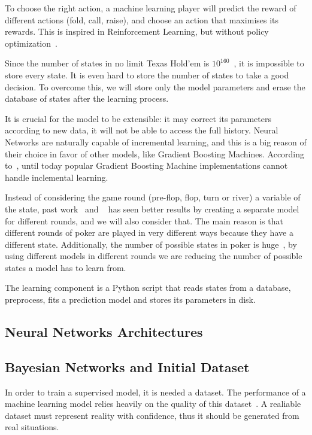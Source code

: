 To choose the right action, a machine learning player will predict the reward of different actions (fold, call, raise), and choose an action that maximises its rewards. This is inspired in Reinforcement Learning, but without policy optimization~\cite{Silver2016}.

Since the number of states in no limit Texas Hold’em is $10^{160}$~\cite{Johanson2013}, it is impossible to store every state. It is even hard to store the number of states to take a good decision. To overcome this, we will store only the model parameters and erase the database of states after the learning process.

It is crucial for the model to be extensible: it may correct its parameters according to new data, it will not be able to access the full history. Neural Networks are naturally capable of incremental learning, and this is a big reason of their choice in favor of other models, like Gradient Boosting Machines. According to~\cite{xgboost-github}, until today popular Gradient Boosting Machine implementations cannot handle inclemental learning.

Instead of considering the game round (pre-flop, flop, turn or river) a variable of the state, past work~\cite{Sirin2008} and ~\cite{Moravcik2017} has seen better results by creating a separate model for different rounds, and we will also consider that. The main reason is that different rounds of poker are played in very different ways because they have a different state. Additionally, the number of possible states in poker is huge~\cite{Johanson2013}, by using different models in different rounds we are reducing the number of possible states a model has to learn from.

The learning component is a Python script that reads states from a database, preprocess, fits a prediction model and stores its parameters in disk.

\subsection{Neural Networks Architectures}

\subsection{Bayesian Networks and Initial Dataset}
\label{sec:data-generation}

In order to train a supervised model, it is needed a dataset. The performance of a machine learning model relies heavily on the quality of this dataset~\cite{Polikar2001}. A realiable dataset must represent reality with confidence, thus it should be generated from real situations.

